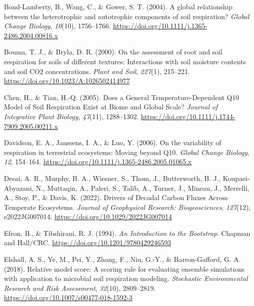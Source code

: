 \documentclass[
  letterpaper,
  DIV=11,
  numbers=noendperiod]{scrartcl}
\newlength{\cslhangindent}
\newenvironment{CSLReferences}[2] %
 {\begin{list}{}{%
  \setlength{\itemindent}{0pt}
  \setlength{\leftmargin}{0pt}
  \setlength{\parsep}{0pt}
  \ifodd #1
   \setlength{\leftmargin}{\cslhangindent}
   \setlength{\itemindent}{-1\cslhangindent}
  \fi
  \setlength{\itemsep}{#2\baselineskip}}}
 {\end{list}}
\begin{document}
\begin{CSLReferences}{1}{0}
Bond-Lamberty, B., Wang, C., \& Gower, S. T. (2004). A global
relationship between the heterotrophic and autotrophic components of
soil respiration? \emph{Global Change Biology}, \emph{10}(10),
1756--1766. \url{https://doi.org/10.1111/j.1365-2486.2004.00816.x}

Bouma, T. J., \& Bryla, D. R. (2000). On the assessment of root and soil
respiration for soils of different textures: Interactions with soil
moisture contents and soil {CO2} concentrations. \emph{Plant and Soil},
\emph{227}(1), 215--221. \url{https://doi.org/10.1023/A:1026502414977}

Chen, H., \& Tian, H.-Q. (2005). Does a {General Temperature-Dependent
Q10 Model} of {Soil Respiration Exist} at {Biome} and {Global Scale}?
\emph{Journal of Integrative Plant Biology}, \emph{47}(11), 1288--1302.
\url{https://doi.org/10.1111/j.1744-7909.2005.00211.x}

Davidson, E. A., Janssens, I. A., \& Luo, Y. (2006). On the variability
of respiration in terrestrial ecosystems: Moving beyond {Q10}.
\emph{Global Change Biology}, \emph{12}, 154--164.
\url{https://doi.org/10.1111/j.1365-2486.2005.01065.x}

Desai, A. R., Murphy, B. A., Wiesner, S., Thom, J., Butterworth, B. J.,
Koupaei-Abyazani, N., Muttaqin, A., Paleri, S., Talib, A., Turner, J.,
Mineau, J., Merrelli, A., Stoy, P., \& Davis, K. (2022). Drivers of
{Decadal Carbon Fluxes Across Temperate Ecosystems}. \emph{Journal of
Geophysical Research: Biogeosciences}, \emph{127}(12), e2022JG007014.
\url{https://doi.org/10.1029/2022JG007014}

Efron, B., \& Tibshirani, R. J. (1994). \emph{An {Introduction} to the
{Bootstrap}}. {Chapman and Hall/CRC}.
\url{https://doi.org/10.1201/9780429246593}

Elshall, A. S., Ye, M., Pei, Y., Zhang, F., Niu, G.-Y., \&
Barron-Gafford, G. A. (2018). Relative model score: A scoring rule for
evaluating ensemble simulations with application to microbial soil
respiration modeling. \emph{Stochastic Environmental Research and Risk
Assessment}, \emph{32}(10), 2809--2819.
\url{https://doi.org/10.1007/s00477-018-1592-3}


\end{CSLReferences}
\end{document}
